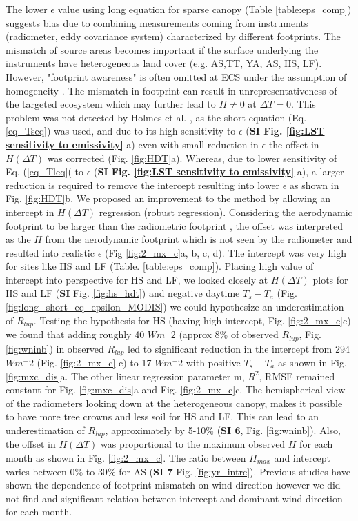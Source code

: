 \documentclass[fleqn,10pt]{wlscirep}
\begin{document}
The lower $\epsilon$ value using long equation for sparse canopy (Table \ref{table:eps_comp}) suggests bias due to combining measurements coming from instruments (radiometer, eddy covariance system) characterized by different footprints\cite{marcolla2018geometry}. The mismatch of  source areas becomes important if the surface underlying the instruments  have heterogeneous land cover (e.g. AS,TT, YA, AS, HS, LF). However, "footprint awareness" is  often omitted at ECS under the assumption of ho­mogeneity \cite{chu2021representativeness}. The mismatch in footprint can result in unrepresentativeness of the targeted ecosystem which may further lead to $H\not= 0$ at $\Delta T=0$. This problem was not detected by Holmes et al. \cite{holmes_land_2009-1}, as the short equation (Eq. \ref{eq_Tseq}) was used, and due to its high sensitivity to $\epsilon$ (\textbf{SI Fig. \ref{fig:LST sensitivity to emissivity}} a) even  with small reduction in $\epsilon$ the offset in $H(\Delta T)$ was corrected (Fig. \ref{fig:HDT}a). Whereas, due to lower sensitivity of Eq. (\ref{eq_Tleq}( to $\epsilon$ (\textbf{SI Fig. \ref{fig:LST sensitivity to emissivity}} a), a larger reduction is required to remove the intercept resulting into lower $\epsilon$ as shown in Fig. \ref{fig:HDT}b. We proposed an improvement to the method by allowing an intercept in $H(\Delta T)$ regression (robust regression). Considering  the aerodynamic footprint to be larger than the radiometric footprint \cite{marcolla2018geometry,chu2021representativeness}, the offset was interpreted as the $H$ from the aerodynamic footprint which is not seen by the radiometer and resulted into realistic $\epsilon$ (Fig {\ref{fig:2_mx_c}a, b, c, d). The intercept was very high for sites like HS and LF (Table. \ref{table:eps_comp}). Placing high value of intercept into perspective for HS and LF, we looked closely at $H(\Delta T)$ plots for HS and LF (\textbf{SI} Fig. \ref{fig:hs_hdt}) and negative daytime $T_{s} -T_{a}$ (Fig. \ref{fig:long_short_eq_epsilon_MODIS}) we could hypothesize an underestimation of $R_{lup}$. Testing the hypothesis for HS (having high intercept, Fig. \ref{fig:2_mx_c}c) we found that  adding roughly 40 $Wm^-{2}$ (approx 8\% of observed $R_{lup}$, Fig. \ref{fig:wninb}) in observed $R_{lup}$ led to significant reduction in the intercept from 294 $Wm^-{2}$ (Fig. \ref{fig:2_mx_c} c) to 17 $Wm^-{2}$ with positive $T_{s} - T_{a}$ as shown in Fig. \ref{fig:mxc_dis}a. The other linear regression parameter m, $R^{2}$, RMSE remained constant for Fig. \ref{fig:mxc_dis}a and Fig. \ref{fig:2_mx_c}c. The hemispherical view of the radiometers looking down at the heterogeneous canopy, makes it possible to have more tree crowns and less soil for HS and LF. This can lead to an underestimation of $R_{lup}$, approximately by 5-10$\%$ (\textbf{SI 6}, Fig. \ref{fig:wninb}). Also, the offset in $H(\Delta T)$ was proportional to the maximum observed $H$ for each month as shown in Fig. \ref{fig:2_mx_c}. The ratio between $H_{max}$ and intercept varies between $0\%$ to $30 \%$ for AS (\textbf{SI 7} Fig. \ref{fig:yr_intrc}). Previous studies have shown the dependence of footprint mismatch on wind direction \cite{chu2021representativeness,marcolla2018geometry,morillas2013using} however we did not find and significant relation between intercept and dominant wind direction for each month.
}
\end{document}
